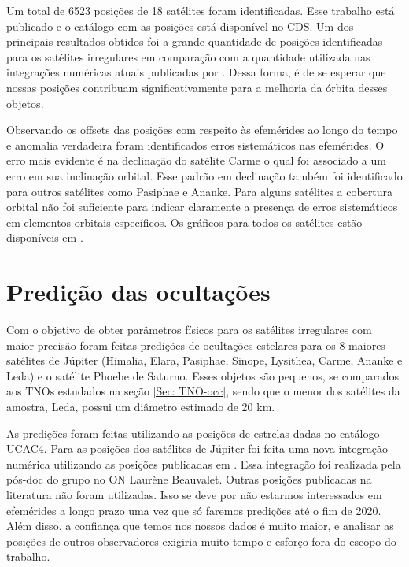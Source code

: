 \documentclass[12pt,a4paper]{report}
\begin{document}
Um total de 6523 posições de 18 satélites foram identificadas. Esse trabalho está publicado \citep{GomesJunior2015-Irregular} e o catálogo com as posições está disponível no CDS. Um dos principais resultados obtidos foi a grande quantidade de posições identificadas para os satélites irregulares em comparação com a quantidade utilizada nas integrações numéricas atuais publicadas por \cite{Jacobson2012}. Dessa forma, é de se esperar que nossas posições contribuam significativamente para a melhoria da órbita desses objetos.

Observando os offsets das posições com respeito às efemérides ao longo do tempo e anomalia verdadeira foram identificados erros sistemáticos nas efemérides. O erro mais evidente é na declinação do satélite Carme o qual foi associado a um erro em sua inclinação orbital. Esse padrão em declinação também foi identificado para outros satélites como Pasiphae e Ananke. Para alguns satélites a cobertura orbital não foi suficiente para indicar claramente a presença de erros sistemáticos em elementos orbitais específicos. Os gráficos para todos os satélites estão disponíveis em \cite{GomesJunior2015-Irregular}.


\section{Predição das ocultações}
\label{Sec: Irr-predic}

\indent \indent Com o objetivo de obter parâmetros físicos para os satélites irregulares com maior precisão foram feitas predições de ocultações estelares para os 8 maiores satélites de Júpiter (Himalia, Elara, Pasiphae, Sinope, Lysithea, Carme, Ananke e Leda) e o satélite Phoebe de Saturno. Esses objetos são pequenos, se comparados aos TNOs estudados na seção \ref{Sec: TNO-occ}, sendo que o menor dos satélites da amostra, Leda, possui um diâmetro estimado de 20 km.

As predições foram feitas utilizando as posições de estrelas dadas no catálogo UCAC4. Para as posições dos satélites de Júpiter foi feita uma nova integração numérica utilizando as posições publicadas em \cite{GomesJunior2015-Irregular}. Essa integração foi realizada pela pós-doc do grupo no ON Laurène Beauvalet. Outras posições publicadas na literatura não foram utilizadas. Isso se deve por não estarmos interessados em efemérides a longo prazo uma vez que só faremos predições até o fim de 2020. Além disso, a confiança que temos nos nossos dados é muito maior, e analisar as posições de outros observadores exigiria muito tempo e esforço fora do escopo do trabalho.
\end{document}

